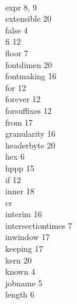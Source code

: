 {{{\\expr  8, 9\cr
\\extensible  20\cr
\\false  4\cr
\\fi  12\cr
\\floor  7\cr
\\fontdimen  20\cr
\\fontmaking  16\cr
\\for  12\cr
\\forever  12\cr
\\forsuffixes  12\cr
\\from  17\cr
\\granularity 16\cr
\\headerbyte  20\cr
\\hex  6\cr
\\hppp  15\cr
\\if  12\cr
\\inner  18\cr
\\cr
\\interim  16\cr
\\intersectiontimes  7\cr
\\inwindow  17\cr
\\keeping  17\cr
\\kern  20\cr
\\known  4\cr
\\jobname  5\cr
\\length  6\cr
}}\hfil{}}

